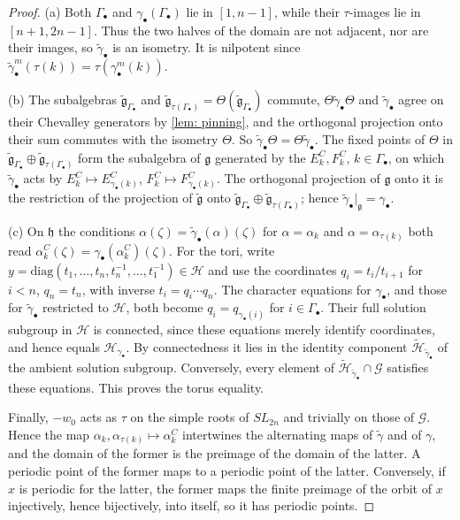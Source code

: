\documentclass[a4paper]{amsart}
\numberwithin{equation}{section}
\theoremstyle{definition}
\theoremstyle{remark}
\newcommand{\mfh}{\mathfrak{h}}
\newcommand{\mfg}{\mathfrak{g}}
\newcommand{\mcG}{\mathcal{G}}
\newcommand{\mcH}{\mathcal{H}}
\newcommand{\tg}{\widetilde{\gamma}}
\newcommand{\Vt}{\Theta}
\newcommand{\SL}{SL_{2n}}
\begin{document}
\begin{proof}
  (a) Both $\Gamma_\bullet$ and $\gamma_\bullet(\Gamma_\bullet)$ lie in $[1,n-1]$, while their $\tau$-images lie in $[n+1,2n-1]$.
  Thus the two halves of the domain are not adjacent, nor are their images, so $\tg_\bullet$ is an isometry.
  It is nilpotent since $\tg_\bullet^m(\tau(k))=\tau(\gamma_\bullet^m(k))$.

  (b) The subalgebras $\widetilde{\mfg}_{\Gamma_\bullet}$ and $\widetilde{\mfg}_{\tau(\Gamma_\bullet)}=\Vt(\widetilde{\mfg}_{\Gamma_\bullet})$ commute, $\Vt\tg_\bullet\Vt$ and $\tg_\bullet$ agree on their Chevalley generators by \cref{lem: pinning}, and the orthogonal projection onto their sum commutes with the isometry $\Vt$.
  So $\tg_\bullet\Vt=\Vt\tg_\bullet$.
  The fixed points of $\Vt$ in $\widetilde{\mfg}_{\Gamma_\bullet}\oplus\widetilde{\mfg}_{\tau(\Gamma_\bullet)}$ form the subalgebra of $\mfg$ generated by the $E^C_k,F^C_k$, $k\in\Gamma_\bullet$, on which $\tg_\bullet$ acts by $E^C_k\mapsto E^C_{\gamma_\bullet(k)}$, $F^C_k\mapsto F^C_{\gamma_\bullet(k)}$.
  The orthogonal projection of $\mfg$ onto it is the restriction of the projection of $\widetilde{\mfg}$ onto $\widetilde{\mfg}_{\Gamma_\bullet}\oplus\widetilde{\mfg}_{\tau(\Gamma_\bullet)}$; hence $\tg_\bullet|_\mfg=\gamma_\bullet$.

  (c) On $\mfh$ the conditions $\alpha(\zeta)=\tg_\bullet(\alpha)(\zeta)$ for $\alpha=\alpha_k$ and $\alpha=\alpha_{\tau(k)}$ both read $\alpha^C_k(\zeta)=\gamma_\bullet(\alpha^C_k)(\zeta)$.
  For the tori, write $y=\mathrm{diag}(t_1,\dots,t_n,t_n^{-1},\dots,t_1^{-1})\in\mcH$ and use the coordinates $q_i=t_i/t_{i+1}$ for $i<n$, $q_n=t_n$, with inverse $t_i=q_i\cdots q_n$.
  The character equations for $\gamma_\bullet$, and those for $\tg_\bullet$ restricted to $\mcH$, both become $q_i=q_{\gamma_\bullet(i)}$ for $i\in\Gamma_\bullet$.
  Their full solution subgroup in $\mcH$ is connected, since these equations merely identify coordinates, and hence equals $\mcH_{\gamma_\bullet}$.
  By connectedness it lies in the identity component $\widetilde{\mcH}_{\tg_\bullet}$ of the ambient solution subgroup. Conversely, every element of $\widetilde{\mcH}_{\tg_\bullet}\cap\mcG$ satisfies these equations.
  This proves the torus equality.

  Finally, $-w_0$ acts as $\tau$ on the simple roots of $\SL$ and trivially on those of $\mcG$.
  Hence the map $\alpha_k,\alpha_{\tau(k)}\mapsto\alpha^C_k$ intertwines the alternating maps of $\tg$ and of $\gamma$, and the domain of the former is the preimage of the domain of the latter.
  A periodic point of the former maps to a periodic point of the latter. Conversely, if $x$ is periodic for the latter, the former maps the finite preimage of the orbit of $x$ injectively, hence bijectively, into itself, so it has periodic points.
\end{proof}
\end{document}
